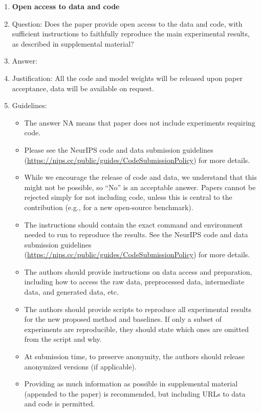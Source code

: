 \documentclass{article}
\begin{document}
\begin{enumerate}
\item {\bf Open access to data and code}
    \item[] Question: Does the paper provide open access to the data and code, with sufficient instructions to faithfully reproduce the main experimental results, as described in supplemental material?
    \item[] Answer: \answerYes{} %
    \item[] Justification:  All the code and model weights will be released upon paper acceptance, data will be available on request.
    \item[] Guidelines:
    \begin{itemize}
        \item The answer NA means that paper does not include experiments requiring code.
        \item Please see the NeurIPS code and data submission guidelines (\url{https://nips.cc/public/guides/CodeSubmissionPolicy}) for more details.
        \item While we encourage the release of code and data, we understand that this might not be possible, so “No” is an acceptable answer. Papers cannot be rejected simply for not including code, unless this is central to the contribution (e.g., for a new open-source benchmark).
        \item The instructions should contain the exact command and environment needed to run to reproduce the results. See the NeurIPS code and data submission guidelines (\url{https://nips.cc/public/guides/CodeSubmissionPolicy}) for more details.
        \item The authors should provide instructions on data access and preparation, including how to access the raw data, preprocessed data, intermediate data, and generated data, etc.
        \item The authors should provide scripts to reproduce all experimental results for the new proposed method and baselines. If only a subset of experiments are reproducible, they should state which ones are omitted from the script and why.
        \item At submission time, to preserve anonymity, the authors should release anonymized versions (if applicable).
        \item Providing as much information as possible in supplemental material (appended to the paper) is recommended, but including URLs to data and code is permitted.
    \end{itemize}



\end{enumerate}
\end{document}
